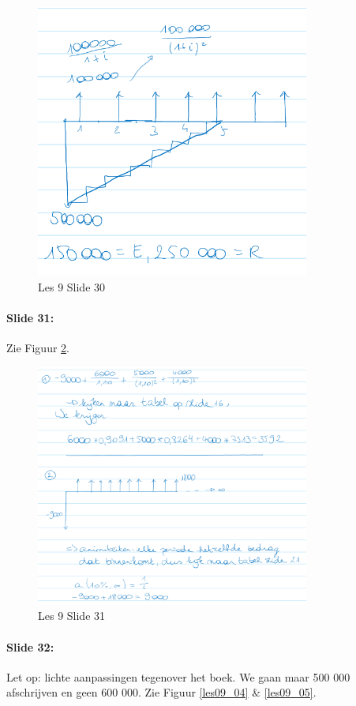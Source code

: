 \documentclass[10pt,a4paper]{report}
\begin{document}
\begin{figure}[h!]
\centering
\includegraphics[width=90mm]{Les09_02.png}
\caption{Les 9 Slide 30} 
\label{les09_02}
\end{figure}

\paragraph{Slide 31:} Zie Figuur \ref{les09_03}.

\begin{figure}[h!]
\centering
\includegraphics[width=90mm]{Les09_03.png}
\caption{Les 9 Slide 31} 
\label{les09_03}
\end{figure}

\paragraph{Slide 32:} Let op: lichte aanpassingen tegenover het boek. We gaan maar 500 000 afschrijven en geen 600 000. Zie Figuur \ref{les09_04} $\&$ \ref{les09_05}.
\end{document}
